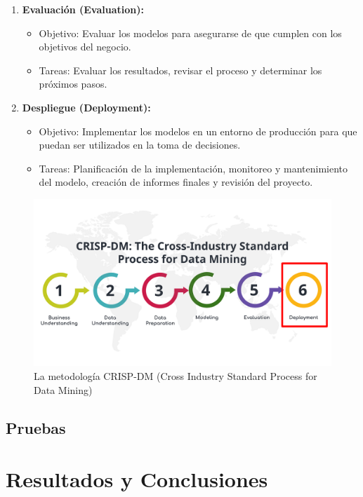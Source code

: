\documentclass{article}
\begin{document}
\begin{enumerate}
\item \textbf{Evaluación (Evaluation):}

\begin{itemize}
\item Objetivo: Evaluar los modelos para asegurarse de que cumplen con los objetivos del negocio.
\item Tareas: Evaluar los resultados, revisar el proceso y determinar los próximos pasos.
\end{itemize}

\item \textbf{Despliegue (Deployment):}

\begin{itemize}
\item Objetivo: Implementar los modelos en un entorno de producción para que puedan ser utilizados en la toma de decisiones.
\item Tareas: Planificación de la implementación, monitoreo y mantenimiento del modelo, creación de informes finales y revisión del proyecto.
\end{itemize}

\end{enumerate}

\begin{figure}[h]
\centering
\includegraphics[width=0.9\linewidth]{images/CRISP-DM.png}
\caption{\label{fig:Canasta}La metodología CRISP-DM (Cross Industry Standard Process for Data Mining)}
\end{figure}

\subsection{Pruebas}

\section{Resultados y Conclusiones}
\end{document}
